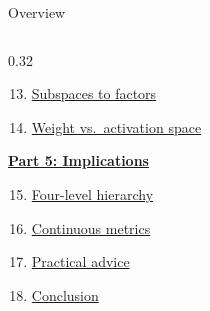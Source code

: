 \documentclass[aspectratio=169,11pt]{beamer}
\begin{document}
\begin{frame}{Overview}
\begin{columns}[T]
\begin{column}{0.32\textwidth}
\begin{enumerate}
  \setcounter{enumi}{12}
  \item \hyperlink{sec12b}{Subspaces to factors}
  \item \hyperlink{sec12c}{Weight vs.\ activation space}
\end{enumerate}
\vspace{0.5em}
\textbf{\hyperlink{part5}{Part 5: Implications}}
\begin{enumerate}
  \setcounter{enumi}{14}
  \item \hyperlink{sec13}{Four-level hierarchy}
  \item \hyperlink{sec14}{Continuous metrics}
  \item \hyperlink{sec15}{Practical advice}
  \item \hyperlink{sec16}{Conclusion}
\end{enumerate}
\end{column}
\end{columns}
\end{frame}


\begin{frame}[plain]
\hypertarget{part1}{}
\vfill
\begin{center}
  \setlength{\fboxrule}{2.5pt}%
\end{center}
\vfill
\end{frame}
\end{document}
